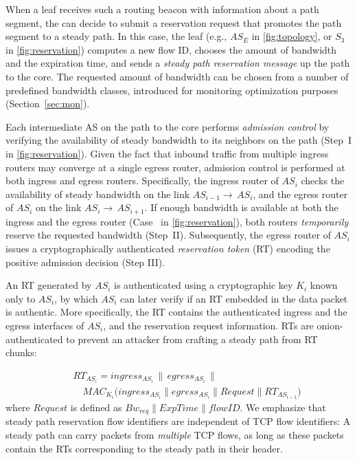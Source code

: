 \fi
When a leaf \AD receives such a routing beacon with information about
a path segment, the \AD can decide to submit a reservation request
that promotes the path segment to a steady path. In this case, the
leaf \AD (e.g., $AS_E$ in \autoref{fig:topology}, or $S_3$ in
\autoref{fig:reservation}) computes a new flow ID, chooses the amount
of bandwidth and the expiration time, and sends a \emph{steady path
reservation message} up the path to the core. 
The requested amount of bandwidth can be chosen from a number of predefined
bandwidth classes, introduced for monitoring optimization purposes
(Section~\ref{sec:mon}).

Each intermediate AS on the path to the core performs \textit{admission
control} by verifying the availability of steady bandwidth to its
neighbors on the path (Step~I in \autoref{fig:reservation}). Given
the fact that inbound traffic from multiple ingress routers may
converge at a single egress router, admission control is performed at
both ingress and egress routers. Specifically, the ingress router of
$AS_i$ checks the availability of steady bandwidth on the link
$AS_{i-1}\rightarrow\,AS_i$, and the egress router of $AS_i$ on the
link $AS_i\rightarrow\,AS_{i+1}$.
If enough bandwidth is available at both the ingress and the egress
router (Case~ in \autoref{fig:reservation}), both routers
\textit{temporarily} reserve the requested bandwidth (Step~II).
Subsequently, the egress router of $AS_i$ issues a cryptographically
authenticated \textit{reservation token} (RT) encoding the positive
admission decision (Step III).

An RT generated by $AS_i$ is authenticated using a cryptographic key
$K_i$ known only to $AS_i$, by which $AS_i$ can later verify if an RT
embedded in the data packet is authentic.
More specifically, the RT contains the authenticated ingress and the
egress interfaces of $AS_i$, and the reservation request information.
RTs are onion-authenticated to prevent an attacker from crafting a
steady path from RT chunks:

\vspace{-12pt}
\begin{equation*}
\begin{aligned}
\quad & \mathit{RT}_\mathit{AS_i} =
  \mathit{ingress_{AS_i}} \,\parallel\, \mathit{egress_{AS_i}} \,\parallel \\
\quad & \quad
  MAC_{K_i}\big( \mathit{ingress_{AS_i}} \parallel \mathit{egress_{AS_i}} \parallel \mathit{Request} \parallel RT_\mathit{AS_{i-1}}\big)
\end{aligned}
\label{eq:RT}
\end{equation*}
where $\mathit{Request}$ is defined as
$\mathit{Bw_{req}}\parallel\mathit{ExpTime}\parallel\mathit{flowID}$.
We emphasize that steady path reservation flow identifiers are independent of
TCP flow identifiers: A steady path can carry packets from \emph{multiple} TCP
flows, as long as these packets contain the RTs corresponding to the steady
path in their header.


